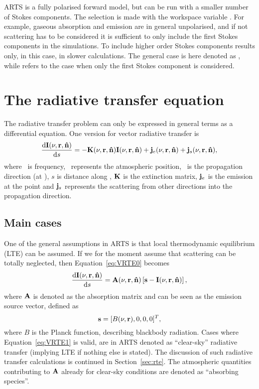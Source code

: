 ARTS is a fully polarised forward model, but can be run with a smaller
number of Stokes components. The selection is made with the workspace
variable . For example, gaseous absorption and
emission are in general unpolarised, and if not scattering has to be
considered it is sufficient to only include the first Stokes
components in the simulations. To include higher order Stokes
components results only, in this case, in slower calculations. The
general case is here denoted as ,
while  refers to the case when
only the first Stokes component is considered.
 


\section{The radiative transfer equation}
\label{sec:rteq}

The radiative transfer problem can only be expressed in general terms as a
differential equation. One version for vector radiative transfer is
\begin{equation}
    \label{eq:VRTE0}
  \frac {\mathrm{d}{\bf I}(\nu,{\bf r},{\bf \hat{n}})}{\mathrm{d} s} =
    -{\bf K}(\nu,{\bf r},{\bf \hat{n}}) {\bf I}(\nu,{\bf r},{\bf \hat{n}}) +
    \mathbf{j}_e(\nu,{\bf r},{\bf \hat{n}}) + \mathbf{j}_s(\nu,{\bf r},{\bf \hat{n}}),  
\end{equation}
where \Frq\ is frequency, \PPos\ represents the atmospheric position, \PDir\ is
the propagation direction (at \PPos), $s$ is distance along \PDir, ${\bf K}$ is
the extinction matrix, $\mathbf{j}_e$ is the emission at the point
and $\mathbf{j}_s$ represents the scattering from other directions into the
propagation direction. 


\subsection{Main cases}
\label{sec:rteq:cases}
%
One of the general assumptions in ARTS is that local thermodynamic equilibrium
(LTE) can be assumed. If we for the moment assume that scattering can be
totally neglected, then Equation~\ref{eq:VRTE0} becomes
\begin{equation}
  \label{eq:VRTE1}
  \frac{\mathrm{d}{\bf I}(\nu,{\bf r},{\bf \hat{n}})}{\mathrm{d} s} =
    {\bf A}(\nu,{\bf r},{\bf \hat{n}})\left[ \mathbf{s}- {\bf I}(\nu,{\bf r},{\bf \hat{n}})
    \right],
\end{equation}
where ${\bf A}$ is denoted as the absorption matrix and  can be seen
as the emission source vector, defined as
\begin{equation}
  \mathbf{s} = [B(\nu,{\bf r}),0,0,0]^T,
\end{equation}
where $B$ is the Planck function, describing blackbody radiation. Cases where
Equation~\ref{eq:VRTE1} is valid, are in ARTS denoted as ``clear-sky''
radiative transfer (implying LTE if nothing else is stated). The discussion of
such radiative transfer calculations is continued in Section~\ref{sec:rte}. The
atmospheric quantities contributing to ${\bf A}$ already for clear-sky
conditions are denoted as ``absorbing species''.

